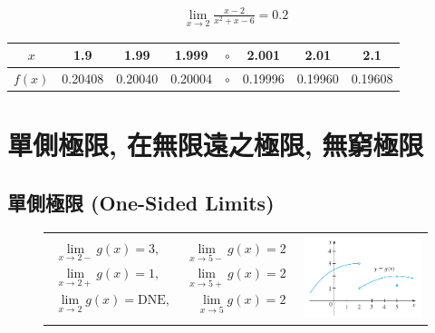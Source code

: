 \documentclass[12pt,a4paper]{extarticle}
\theoremstyle{definition}
\begin{document}
\vspace{5mm}

\hspace{-5mm}
\begin{minipage}{0.18\textwidth}
\begin{align*}
  \lim_{x\to 2}\frac{x - 2}{x^2 + x - 6} = 0.2
\end{align*}
\end{minipage}
\quad
\begin{minipage}{0.85\textwidth}
  \begin{tabular}{cccccccc}
    \toprule
    $x$ & 1.9 & 1.99 & 1.999 & $\circ$ & 2.001 & 2.01 & 2.1 \\
    \hline
    \addlinespace[2mm]
    $f(x)$ & 0.20408 & 0.20040 &0.20004 & $\circ$ & 0.19996 & 0.19960 & 0.19608 \\
    \bottomrule
  \end{tabular}
\end{minipage}

\section*{單側極限, 在無限遠之極限, 無窮極限}

\subsection*{單側極限 (One-Sided Limits) }
\vspace{-10mm}

\begin{figure}[ht]
  \centering
  \begin{tabularx}{0.8\textwidth}{X>{\centering\arraybackslash}X}
    \begin{align*}
      \lim_{x\to2-}g(x) = 3,\qquad\lim_{x\to5-}g(x) = 2 \\
      \lim_{x\to2+}g(x) = 1,\qquad\lim_{x\to5+}g(x) = 2 \\
      \lim_{x\to2}g(x) = \text{DNE},\qquad\lim_{x\to5}g(x) = 2
    \end{align*}
  &  
  \includegraphics[scale=1.4,page=1]{fig/g.pdf}
 \end{tabularx}
\end{figure}
\end{document}
